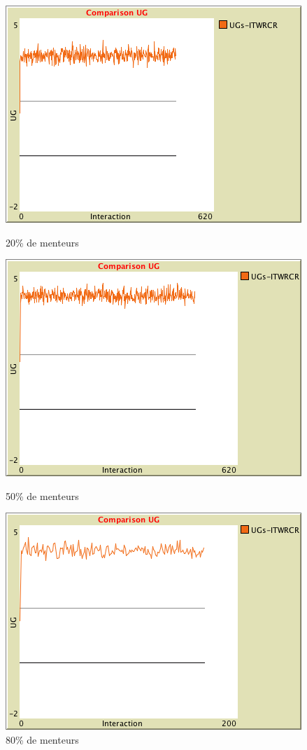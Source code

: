 \begin{figure}[H]
    \begin{minipage}{0.3\textwidth}
     \centering
     \includegraphics[width=.6\linewidth]{images/evolutionLiars/20.png}
     \caption{20\% de menteurs}\label{Fig:Data2}
   \end{minipage}
   \begin{minipage}{0.3\textwidth}
     \centering
     \includegraphics[width=.6\linewidth]{images/evolutionLiars/50.png}
     \caption{50\% de menteurs}\label{Fig:Data1}
   \end{minipage}
   \begin{minipage}{0.3\textwidth}
     \centering
     \includegraphics[width=.6\linewidth]{images/evolutionLiars/80.png}
     \caption{80\% de menteurs}\label{Fig:Data2}
   \end{minipage}
\end{figure}



